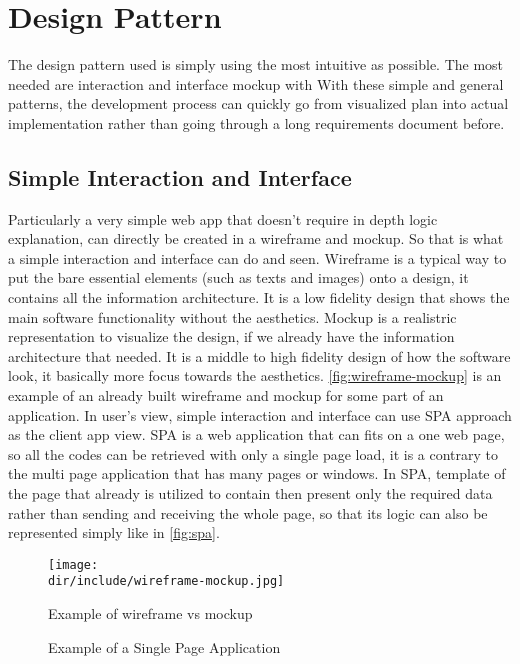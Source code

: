 \section{Design Pattern}
\label{sec:design-pattern}

The design pattern used is simply using the most intuitive as possible.
The most needed are interaction and interface mockup with
With these simple and general patterns, the development process can quickly go from visualized plan into actual implementation rather than going through a long requirements document before.

\subsection{Simple Interaction and Interface}
\label{ssec:simple-interfaction}

Particularly a very simple web app that doesn't require in depth logic explanation, can directly be created in a wireframe and mockup.
So that is what a simple interaction and interface can do and seen.
Wireframe is a typical way to put the bare essential elements (such as texts and images) onto a design, it contains all the information architecture.
It is a low fidelity design that shows the main software functionality without the aesthetics.
Mockup is a realistric representation to visualize the design, if we already have the information architecture that needed.
It is a middle to high fidelity design of how the software look, it basically more focus towards the aesthetics.
\autoref{fig:wireframe-mockup} is an example of an already built wireframe and mockup for some part of an application.
In user's view, simple interaction and interface can use \ac{SPA} approach as the client app view.
\ac{SPA} is a web application that can fits on a one web page, so all the codes can be retrieved with only a single page load, it is a contrary to the multi page application that has many pages or windows.
In \ac{SPA}, template of the page that already is utilized to contain then present only the required data rather than sending and receiving the whole page, so that its logic can also be represented simply like in \autoref{fig:spa}.

\begin{figure}[htbp]
    \centering
    \texttt{[image: \\dir/include/wireframe-mockup.jpg]}
    \caption[Wireframe vs Mockup Example]{Example of wireframe vs mockup \autocite{Trentini2015WM}}
    \label{fig:wireframe-mockup}
\end{figure}

\begin{figure}[htbp]
    \centering
    \caption[Single Page Application]{Example of a Single Page Application}
    \label{fig:spa}
\end{figure}
